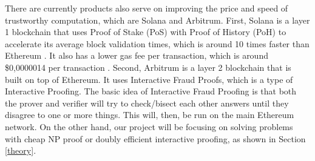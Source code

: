 There are currently products also serve on improving the price and speed of trustworthy computation, which are Solana and Arbitrum. First, Solana is a layer 1 blockchain that uses Proof of Stake (PoS) with Proof of History (PoH) to accelerate its average block validation times, which is around 10 times faster than Ethereum \cite{tyson_2022}. It also has a lower gas fee per transaction, which is around \$0,0000014 per transaction \cite{beincrypto_2022}. Second, Arbitrum is a layer 2 blockchain that is built on top of Ethereum. It uses Interactive Fraud Proofs, which is a type of Interactive Proofing. The basic idea of Interactive Fraud Proofing is that both the prover and verifier will try to check/bisect each other answers until they disagree to one or more things. This will, then, be run on the main Ethereum network. On the other hand, our project will be focusing on solving problems with cheap NP proof or doubly efficient interactive proofing, as shown in Section \ref{theory}.